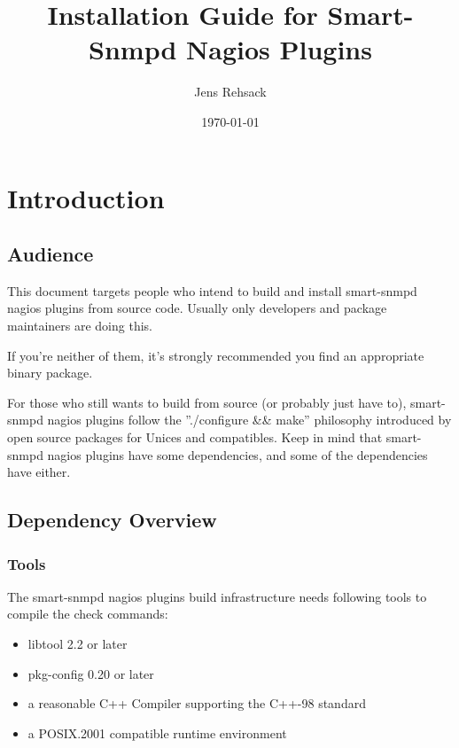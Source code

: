 \usepackage{hyperref}
\usepackage{longtable,tabularx,threeparttable}



\title{Installation Guide for Smart-Snmpd Nagios Plugins}

\author{Jens Rehsack}

\date{\today{}}

\maketitle

\tableofcontents

\section{Introduction}

\subsection{Audience}

This document targets people who intend to build and install smart-snmpd
nagios plugins from source code. Usually only developers and package
maintainers are doing this.

If you're neither of them, it's strongly recommended you find an
appropriate binary package.

For those who still wants to build from source (or probably just have to),
smart-snmpd nagios plugins follow the ''./configure \&\& make'' philosophy
introduced by open source packages for Unices and compatibles. Keep in
mind that smart-snmpd nagios plugins have some dependencies, and some of
the dependencies have either.

\subsection{Dependency Overview}

\subsubsection{Tools}

The smart-snmpd nagios plugins build infrastructure needs following tools
to compile the check commands:

\begin{itemize}
\item{libtool 2.2 or later}
\item{pkg-config 0.20 or later}
\item{a reasonable C++ Compiler supporting the C++-98 standard}
\item{a POSIX.2001 compatible runtime environment}
\end{itemize}

